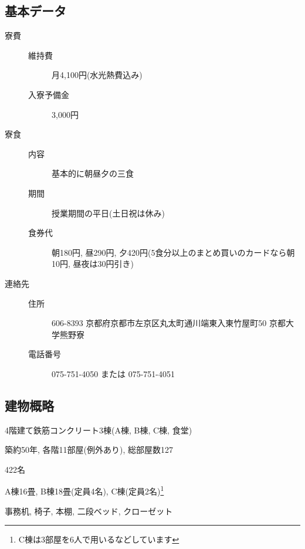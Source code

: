 \documentclass[10pt,b5jsbook,dvips,dvipdfmx,openany]{jsbook}
\theoremstyle{definition}
\begin{document}
		\subsection{基本データ} \label{subsec:data}
		\begin{description} %
		\item[寮費] \hspace{10mm}
			\begin{description}
			\item[維持費] 月4,100円(水光熱費込み)
			\item[入寮予備金] 3,000円
			\end{description}
		\item[寮食] \hspace{10mm} %
			\begin{description}
			\item[内容] 基本的に朝昼夕の三食
			\item[期間] 授業期間の平日(土日祝は休み)
			\item[食券代] 朝180円, 昼290円, 夕420円(5食分以上のまとめ買いのカードなら朝10円, 昼夜は30円引き)
			\end{description}
		\item[連絡先] \hspace{10mm} %
			\begin{description}
			\item[住所]606-8393 京都府京都市左京区丸太町通川端東入東竹屋町50 京都大学熊野寮
			\item[電話番号] 075-751-4050 または 075-751-4051
			\end{description}
		\end{description}

		\subsection{建物概略}
		\begin{description}
		\item 4階建て鉄筋コンクリート3棟(A棟, B棟, C棟, 食堂) 
		\item 築約50年, 各階11部屋(例外あり), 総部屋数127
		\item[定員] 422名
		\item[居室] A棟16畳,  B棟18畳(定員4名), C棟(定員2名)\footnote{C棟は3部屋を6人で用いるなどしています}
		\item[備品] 事務机, 椅子, 本棚, 二段ベッド, クローゼット
		\end{description}
\end{document}
